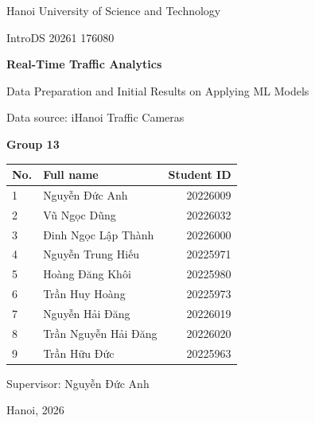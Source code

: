 \documentclass[12pt,a4paper]{article}
\newcommand{\projecttitle}{Real-Time Traffic Analytics}
\begin{document}
\begin{titlepage}
\centering
\vspace*{2cm}
{\large Hanoi University of Science and Technology\par}
\vspace{0.4cm}
{\large IntroDS 20261 176080 \par}
\vspace{2.2cm}

{\Huge\bfseries \projecttitle\par}
\vspace{0.6cm}
{\Large Data Preparation and Initial Results on Applying ML Models\par}
\vspace{0.4cm}
{\large Data source: iHanoi Traffic Cameras\par}
\vspace{2cm}

{\Large\bfseries Group 13\par}
\vspace{0.6cm}

\begin{tabular}{@{}llr@{}}
\toprule
\textbf{No.} & \textbf{Full name} & \textbf{Student ID} \\
\midrule
1 & Nguyễn Đức Anh        & 20226009 \\
2 & Vũ Ngọc Dũng          & 20226032 \\
3 & Đinh Ngọc Lập Thành   & 20226000 \\
4 & Nguyễn Trung Hiếu     & 20225971 \\
5 & Hoàng Đăng Khôi       & 20225980 \\
6 & Trần Huy Hoàng        & 20225973 \\
7 & Nguyễn Hải Đăng       & 20226019 \\
8 & Trần Nguyễn Hải Đăng  & 20226020 \\
9 & Trần Hữu Đức         & 20225963 \\
\bottomrule
\end{tabular}

\vspace{1.2cm}
{\large Supervisor: Nguyễn Đức Anh\par}
\vfill
{\large Hanoi, 2026\par}
\end{titlepage}

\tableofcontents
\newpage
\end{document}
